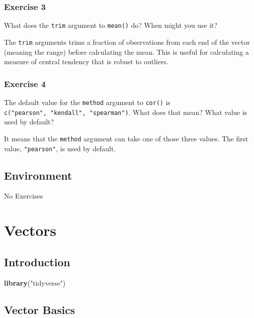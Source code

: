 \documentclass[]{book}
\newenvironment{Shaded}{\begin{snugshade}}{\end{snugshade}}
\newcommand{\KeywordTok}[1]{\textcolor[rgb]{0.13,0.29,0.53}{\textbf{#1}}}
\newcommand{\NormalTok}[1]{#1}
\newcommand{\StringTok}[1]{\textcolor[rgb]{0.31,0.60,0.02}{#1}}
\theoremstyle{plain}
\theoremstyle{remark}
\theoremstyle{definition}
\theoremstyle{definition}
\theoremstyle{definition}
\theoremstyle{remark}
\begin{document}
\hypertarget{exercise-3-40}{%
\subsection{Exercise 3}\label{exercise-3-40}}

What does the \texttt{trim} argument to \texttt{mean()} do? When might
you use it?

The \texttt{trim} arguments trims a fraction of observations from each
end of the vector (meaning the range) before calculating the mean. This
is useful for calculating a measure of central tendency that is robust
to outliers.

\hypertarget{exercise-4-29}{%
\subsection{Exercise 4}\label{exercise-4-29}}

The default value for the \texttt{method} argument to \texttt{cor()} is
\texttt{c("pearson",\ "kendall",\ "spearman")}. What does that mean?
What value is used by default?

It means that the \texttt{method} argument can take one of those three
values. The first value, \texttt{"pearson"}, is used by default.

\hypertarget{environment}{%
\section{Environment}\label{environment}}

No Exercises

\hypertarget{vectors}{%
\chapter{Vectors}\label{vectors}}

\hypertarget{introduction-13}{%
\section{Introduction}\label{introduction-13}}

\begin{Shaded}
\begin{Highlighting}[]
\KeywordTok{library}\NormalTok{(}\StringTok{"tidyverse"}\NormalTok{)}
\end{Highlighting}
\end{Shaded}

\hypertarget{vector-basics}{%
\section{Vector Basics}\label{vector-basics}}
\end{document}

